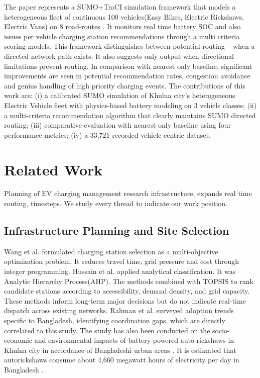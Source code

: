 \documentclass[conference]{IEEEtran}
\begin{document}
The paper represents a SUMO+TraCI simulation framework that models a
heterogeneous fleet of continuous 100 vehicles(Easy Bikes, Electric
Rickshaws, Electric Vans) on 8 road-routes \cite{b10, b11}. It monitors real time
battery SOC and also issues per vehicle charging station recommendations
through a multi criteria scoring models. This framework distinguishes
between potential routing -- when a directed network path exists. It
also suggests only output when directional limitations prevent routing.
In comparison with nearest only baseline, significant improvements are
seen in potential recommendation rates, congestion avoidance and genius
handling of high priority charging events. The contributions of this
work are: (i) a calibrated SUMO simulation of Khulna city's
heterogeneous Electric Vehicle fleet with physics-based battery modeling
on 3 vehicle classes; (ii) a multi-criteria recommendation algorithm
that clearly maintains SUMO directed routing; (iii) comparative
evaluation with nearest only baseline using four performance metrics;
(iv) a 33,721 recorded vehicle centric dataset.

\section{Related Work}

Planning of EV charging management research infrastructure, expands
real time routing, timesteps. We study every thread to indicate our
work position.

\subsection{Infrastructure Planning and Site Selection}

Wang et al. \cite{b2, b5} formulated charging station selection as a
multi-objective optimization problem. It reduces travel time, grid
pressure and cost through integer programming. Hussain et al. \cite{b6}
applied analytical classification. It was Analytic Hierarchy
Process(AHP). The methods combined with TOPSIS to rank candidate
stations according to accessibility, demand density, and grid capacity.
These methods inform long-term major decisions but do not indicate
real-time dispatch across existing networks. Rahman et al. \cite{b1}
surveyed adoption trends specific to Bangladesh, identifying
coordination gaps, which are directly correlated to this study. The study has also been conducted on the socio-economic and environmental impacts of battery-powered auto-rickshaws in Khulna city in accordance of Bangladeshi urban areas \cite{b15}. It is estimated that autorickshaws consume about 4,660 megawatt hours of electricity per day in Bangladesh \cite{b13}.
\end{document}
